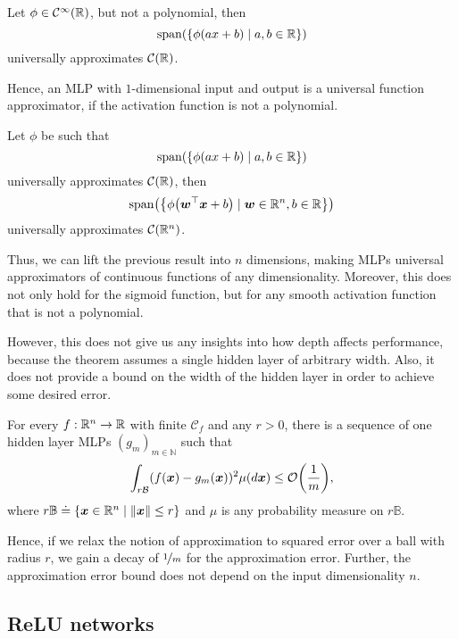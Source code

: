 \begin{theorem}
    Let $\phi \in \mathcal{C}^{\infty}(\mathbb{R})$, but not a polynomial, then \[
        \mathrm{span}(\{ \phi(ax + b) \mid a,b \in \mathbb{R} \})
    \]
    universally approximates $\mathcal{C}(\mathbb{R})$.
\end{theorem}

Hence, an MLP with $1$-dimensional input and output is a universal function approximator, if the
activation function is not a polynomial.

\begin{lemma}
    Let $\phi$ be such that \[
        \mathrm{span}(\{ \phi(ax + b) \mid a,b \in \mathbb{R} \})
    \]
    universally approximates $\mathcal{C}(\mathbb{R})$, then \[
        \mathrm{span}\lft( \lft\{ \phi \lft( \transpose{\vec{w}}\vec{x} + b \rgt) \mid \vec{w} \in \R^n, b \in \R \rgt\} \rgt)
    \]
    universally approximates $\mathcal{C}(\mathbb{R}^n)$.
\end{lemma}

Thus, we can lift the previous result into $n$ dimensions, making MLPs universal approximators of
continuous functions of any dimensionality. Moreover, this does not only hold for the sigmoid
function, but for any smooth activation function that is not a polynomial.

However, this does not give us any insights into how depth affects performance, because the theorem
assumes a single hidden layer of arbitrary width. Also, it does not provide a bound on the width of
the hidden layer in order to achieve some desired error.

\begin{theorem}
    For every $f: \mathbb{R}^n \to \mathbb{R}$ with finite $\mathcal{C}_f$ and any $r > 0$, there is a sequence of one hidden layer MLPs $(g_m)_{m \in \mathbb{N}}$ such that \[
        \int_{r \mathcal{B}} (f(\vec{x}) - g_m(\vec{x}))^2 \mu(d \vec{x}) \leq \bigo{\frac{1}{m}},
    \]
    where $r \mathbb{B} \doteq \{ \bm{x} \in \mathbb{R}^n \mid \| \bm{x} \| \leq r \}$ and $\mu$ is any
    probability measure on $r \mathbb{B}$.
\end{theorem}

Hence, if we relax the notion of approximation to squared error over a ball with radius $r$, we
gain a decay of $\nicefrac{1}{m}$ for the approximation error. Further, the approximation error
bound does not depend on the input dimensionality $n$.

\subsection{ReLU networks}

